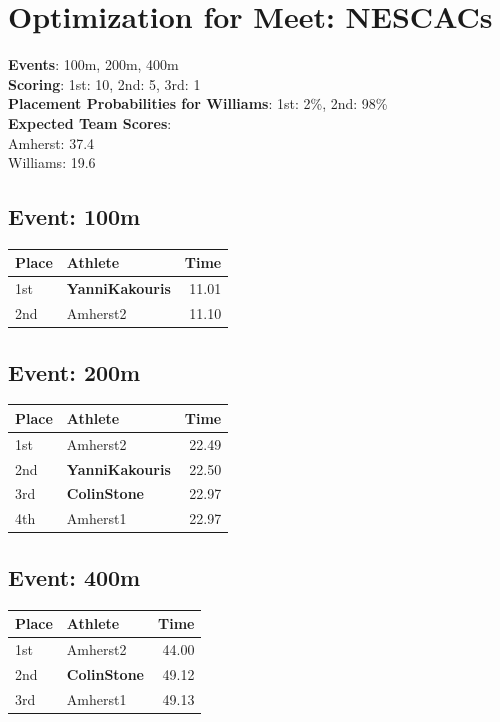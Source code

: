 \documentclass[11pt]{article}
\begin{document}
\section*{Optimization for Meet: NESCACs}

\textbf{Events}: 100m, 200m, 400m\\

\noindent\textbf{Scoring}: 1st: 10, 2nd: 5, 3rd: 1\\

\noindent\textbf{Placement Probabilities for Williams}: 1st: 2\%, 2nd: 98\%\\

\noindent\textbf{Expected Team Scores}: \\

\quad Amherst: 37.4\\

\quad Williams: 19.6\\

\subsection*{Event: 100m}
\begin{tabularx}{\linewidth}{lXr}
\toprule
Place & Athlete & Time \\
\midrule
1st & \textbf{YanniKakouris} & 11.01 \\
2nd & Amherst2 & 11.10 \\
\bottomrule
\end{tabularx}

\subsection*{Event: 200m}
\begin{tabularx}{\linewidth}{lXr}
\toprule
Place & Athlete & Time \\
\midrule
1st & Amherst2 & 22.49 \\
2nd & \textbf{YanniKakouris} & 22.50 \\
3rd & \textbf{ColinStone} & 22.97 \\
4th & Amherst1 & 22.97 \\
\bottomrule
\end{tabularx}

\subsection*{Event: 400m}
\begin{tabularx}{\linewidth}{lXr}
\toprule
Place & Athlete & Time \\
\midrule
1st & Amherst2 & 44.00 \\
2nd & \textbf{ColinStone} & 49.12 \\
3rd & Amherst1 & 49.13 \\
\bottomrule
\end{tabularx}
\end{document}

